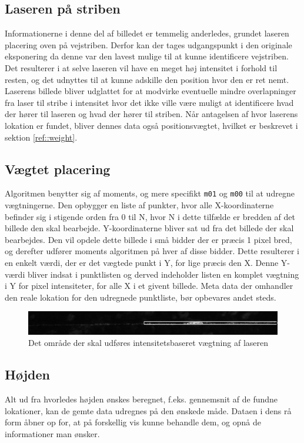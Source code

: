 \subsection{Laseren på striben}
Informationerne i denne del af billedet er temmelig anderledes, grundet laseren placering oven på vejstriben. Derfor kan der tages udgangspunkt i den originale eksponering da denne var den lavest mulige til at kunne identificere vejstriben. Det resulterer i at selve laseren vil have en meget høj intensitet i forhold til resten, og det udnyttes til at kunne adskille den position hvor den er ret nemt. Laserens billede bliver udglattet for at modvirke eventuelle mindre overlapninger fra laser til stribe i intensitet hvor det ikke ville være muligt at identificere hvad der hører til laseren og hvad der hører til striben. Når antagelsen af hvor laserens lokation er fundet, bliver dennes data også positionsvægtet, hvilket er beskrevet i sektion \ref{ref::weight}.

\subsection{Vægtet placering\label{ref::weight}}
Algoritmen benytter sig af moments, og mere specifikt \texttt{m01} og \texttt{m00} til at udregne vægtningerne.
Den opbygger en liste af punkter, hvor alle X-koordinaterne befinder sig i stigende orden fra 0 til N, hvor N i dette tilfælde er bredden af det billede den skal bearbejde.
Y-koordinaterne bliver sat ud fra det billede der skal bearbejdes. Den vil opdele dette billede i små bidder der er præcis 1 pixel bred, og derefter udfører moments algoritmen på hver af disse bidder. Dette resulterer i en enkelt værdi, der er det vægtede punkt i Y, for lige præcis den X. Denne Y-værdi bliver indsat i punktlisten og derved indeholder listen en komplet vægtning i Y for pixel intensiteter, for alle X i et givent billede. Meta data der omhandler den reale lokation for den udregnede punktliste, bør opbevares andet steds.

\begin{figure}[h]
	\centering
	\includegraphics[width=0.7\linewidth]{Billeder/base_5_boxing}
	\caption{Det område der skal udføres intensitetsbaseret vægtning af laseren}
	\label{fig:base_5_boxing}
\end{figure}

\subsection{Højden}
Alt ud fra hvorledes højden ønskes beregnet, f.eks. gennemsnit af de fundne lokationer, kan de gemte data udregnes på den ønskede måde. Dataen i dens rå form åbner op for, at på forskellig vis kunne behandle dem, og opnå de informationer man ønsker.

